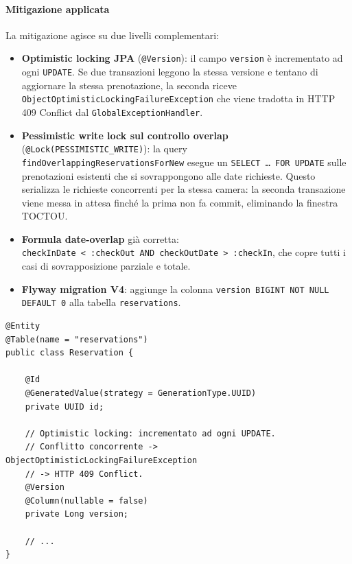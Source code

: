 ﻿\documentclass[a4paper,12pt]{report}
\begin{document}
\paragraph{Mitigazione applicata}
La mitigazione agisce su due livelli complementari:

\begin{itemize}
  \item \textbf{Optimistic locking JPA} (\texttt{@Version}): il campo \texttt{version} è
        incrementato ad ogni \texttt{UPDATE}. Se due transazioni leggono la stessa versione
        e tentano di aggiornare la stessa prenotazione, la seconda riceve
        \texttt{ObjectOptimisticLockingFailureException} che viene tradotta in HTTP 409
        Conflict dal \texttt{GlobalExceptionHandler}.

  \item \textbf{Pessimistic write lock sul controllo overlap} (\texttt{@Lock(PESSIMISTIC\_WRITE)}):
        la query \texttt{findOverlappingReservationsForNew} esegue un
        \texttt{SELECT \ldots\ FOR UPDATE} sulle prenotazioni esistenti che si sovrappongono
        alle date richieste. Questo serializza le richieste concorrenti per la stessa camera:
        la seconda transazione viene messa in attesa finché la prima non fa commit, eliminando
        la finestra TOCTOU.

  \item \textbf{Formula date-overlap} già corretta:\\
        \texttt{checkInDate < :checkOut AND checkOutDate > :checkIn},
        che copre tutti i casi di sovrapposizione parziale e totale.

  \item \textbf{Flyway migration V4}: aggiunge la colonna \texttt{version BIGINT NOT NULL
        DEFAULT 0} alla tabella \texttt{reservations}.
\end{itemize}

\begin{securebox}[title={Codice Sicuro --- Reservation.java (feature/secure-coding-hardening)}]
\begin{lstlisting}[style=java]
@Entity
@Table(name = "reservations")
public class Reservation {

    @Id
    @GeneratedValue(strategy = GenerationType.UUID)
    private UUID id;

    // Optimistic locking: incrementato ad ogni UPDATE.
    // Conflitto concorrente -> ObjectOptimisticLockingFailureException
    // -> HTTP 409 Conflict.
    @Version
    @Column(nullable = false)
    private Long version;

    // ...
}
\end{lstlisting}
\end{securebox}
\end{document}
